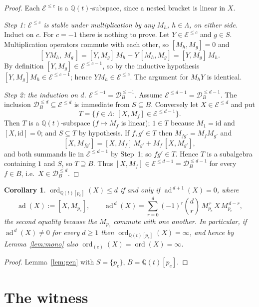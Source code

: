 \documentclass[11pt]{article}
\newtheorem{corollary}[theorem]{Corollary}
\theoremstyle{definition}
\DeclareMathOperator{\ord}{ord}
\DeclareMathOperator{\ad}{ad}
\newcommand{\Q}{\mathbb{Q}}
\newcommand{\Lam}{\Lambda}
\newcommand{\D}{\mathcal{D}}
\begin{document}
\begin{proof}
Each $\mathcal E^{\le c}$ is a $\Q(t)$-subspace, since a nested bracket is linear in $X$.

\emph{Step 1: $\mathcal E^{\le c}$ is stable under multiplication by any $M_h$, $h\in\Lam$,
on either side.}  Induct on $c$.  For $c=-1$ there is nothing to prove.  Let
$Y\in\mathcal E^{\le c}$ and $g\in S$.  Multiplication operators commute with each other,
so $[M_h,M_g]=0$ and
\[
  [\,YM_h,\ M_g\,]=[Y,M_g]\,M_h+Y\,[M_h,M_g]=[Y,M_g]\,M_h .
\]
By definition $[Y,M_g]\in\mathcal E^{\le c-1}$, so by the inductive hypothesis
$[Y,M_g]M_h\in\mathcal E^{\le c-1}$; hence $YM_h\in\mathcal E^{\le c}$.  The argument for
$M_hY$ is identical.

\emph{Step 2: the induction on $d$.}  $\mathcal E^{\le-1}=\D^{\le-1}_B$.  Assume
$\mathcal E^{\le d-1}=\D^{\le d-1}_B$.  The inclusion $\D^{\le d}_B\subseteq\mathcal
E^{\le d}$ is immediate from $S\subseteq B$.  Conversely let $X\in\mathcal E^{\le d}$ and
put
\[
  T=\bigl\{f\in\Lam:\ [X,M_f]\in\mathcal E^{\le d-1}\bigr\}.
\]
Then $T$ is a $\Q(t)$-subspace ($f\mapsto M_f$ is linear); $1\in T$ because
$M_1=\mathrm{id}$ and $[X,\mathrm{id}]=0$; and $S\subseteq T$ by hypothesis.  If
$f,g'\in T$ then $M_{fg'}=M_fM_{g'}$ and
\[
  [X,M_{fg'}]=[X,M_f]\,M_{g'}+M_f\,[X,M_{g'}],
\]
and both summands lie in $\mathcal E^{\le d-1}$ by Step~1; so $fg'\in T$.  Hence $T$ is a
subalgebra containing $1$ and $S$, so $T\supseteq B$.  Thus $[X,M_f]\in\mathcal E^{\le
d-1}=\D^{\le d-1}_B$ for every $f\in B$, i.e.\ $X\in\D^{\le d}_B$.
\end{proof}

\begin{corollary}\label{cor:pe}
$\ord_{\Q(t)[p_e]}(X)\le d$ if and only if $\ad^{\,d+1}(X)=0$, where
\[
  \ad(X):=[X,M_{p_e}],\qquad
  \ad^{\,d}(X)=\sum_{r=0}^{d}(-1)^{r}\binom{d}{r}\,M_{p_e}^{\,r}\,X\,M_{p_e}^{\,d-r},
\]
the second equality because the $M_{p_e}$ commute with one another.  In particular, if
$\ad^{\,d}(X)\neq0$ for every $d\ge1$ then $\ord_{\Q(t)[p_e]}(X)=\infty$, and hence by
Lemma~\ref{lem:mono} also $\ord_{(e)}(X)=\ord(X)=\infty$.
\end{corollary}

\begin{proof}
Lemma~\ref{lem:gen} with $S=\{p_e\}$, $B=\Q(t)[p_e]$.
\end{proof}

\section{The witness}
\end{document}
